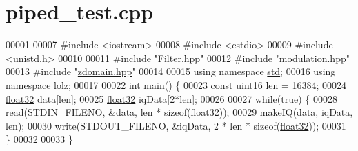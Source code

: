 \hypertarget{piped__test_8cpp_source}{\section{piped\+\_\+test.\+cpp}
\label{piped__test_8cpp_source}
}

\begin{DoxyCode}
00001 
00007 \textcolor{preprocessor}{#include <iostream>}
00008 \textcolor{preprocessor}{#include <cstdio>}
00009 \textcolor{preprocessor}{#include <unistd.h>}
00010 
00011 \textcolor{preprocessor}{#include "\hyperlink{Filter_8hpp}{Filter.hpp}"}
00012 \textcolor{preprocessor}{#include "modulation.hpp"}
00013 \textcolor{preprocessor}{#include "\hyperlink{zdomain_8hpp}{zdomain.hpp}"}
00014 
00015 \textcolor{keyword}{using namespace }\hyperlink{namespacestd}{std};
00016 \textcolor{keyword}{using namespace }\hyperlink{namespacelolz}{lolz};
00017 
\hypertarget{piped__test_8cpp_source_l00022}{}\hyperlink{piped__test_8cpp_ae66f6b31b5ad750f1fe042a706a4e3d4}{00022} \textcolor{keywordtype}{int} \hyperlink{piped__test_8cpp_ae66f6b31b5ad750f1fe042a706a4e3d4}{main}() \{
00023     \textcolor{keyword}{const} \hyperlink{definitions_8hpp_a05f6b0ae8f6a6e135b0e290c25fe0e4e}{uint16} len = 16384;
00024     \hyperlink{definitions_8hpp_aacdc525d6f7bddb3ae95d5c311bd06a1}{float32} data[len];
00025     \hyperlink{definitions_8hpp_aacdc525d6f7bddb3ae95d5c311bd06a1}{float32} iqData[2*len];
00026 
00027     \textcolor{keywordflow}{while}(\textcolor{keyword}{true}) \{
00028         read(STDIN\_FILENO, &data, len * \textcolor{keyword}{sizeof}(\hyperlink{definitions_8hpp_aacdc525d6f7bddb3ae95d5c311bd06a1}{float32}));
00029         \hyperlink{namespaceradio_a7166522e76ff88e8d482491b1b6e2275}{makeIQ}(data, iqData, len);
00030         write(STDOUT\_FILENO, &iqData,  2 * len * \textcolor{keyword}{sizeof}(\hyperlink{definitions_8hpp_aacdc525d6f7bddb3ae95d5c311bd06a1}{float32}));
00031     \}
00032 
00033 \}
\end{DoxyCode}
